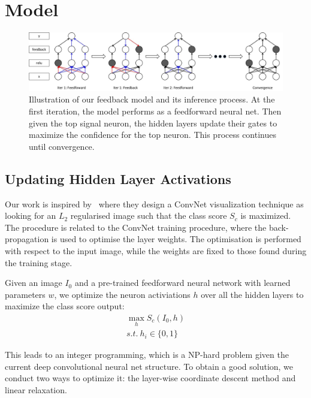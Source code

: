 \section{Model}
\label{sec:model}

\setlength{\tabcolsep}{2pt}
\begin{figure}
\begin{center}
\includegraphics[width=0.95\linewidth]{figs/model/model}
\caption{Illustration of our feedback model and its inference process. At the first iteration, the model performs as a feedforward neural net. Then given the top signal neuron, the hidden layers update their gates to maximize the confidence for the top neuron. This process continues until convergence.}
\label{fig:visual_compare}
\end{center}
\end{figure}

\subsection{Updating Hidden Layer Activations}
Our work is inspired by~\cite{xxx} where they design a ConvNet visualization technique as looking for an $L_2$ regularised image such that the class score $S_c$ is maximized. The procedure is related to the ConvNet training procedure, where the back-propagation is used to optimise the layer weights. The optimisation is performed with respect to the input image, while the weights are fixed to those found during the training stage.

Given an image $I_0$ and a pre-trained feedforward neural network with learned parameters $w$, we optimize the neuron activiations $h$ over all the hidden layers to maximize the class score output:
\begin{equation}
\begin{aligned}
  \max_h S_c(I_0, h) \\
  s.t.\ h_i \in \{0, 1\}
\end{aligned}
\end{equation}

This leads to an integer programming, which is a NP-hard problem given the current deep convolutional neural net structure. To obtain a good solution, we conduct two ways to optimize it: the layer-wise coordinate descent method and linear relaxation.

